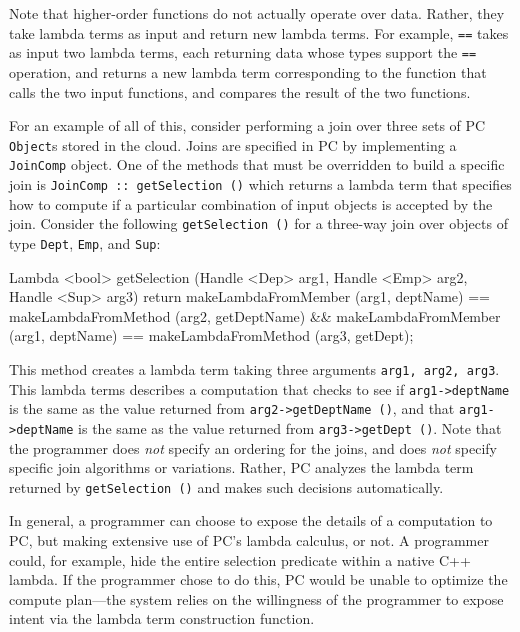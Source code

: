 \noindent Note that higher-order functions do
not actually operate over data.  Rather, they
take lambda terms as input and return new lambda terms.  For example, \texttt{==} takes as input two lambda terms, each returning data whose types
support the \texttt{==} operation, and returns
a new lambda term corresponding to the function that calls the two input functions, and compares the result of the two functions.

For an example of all of this, consider performing a join over three sets of PC \texttt{Object}s stored in the cloud.  
Joins are specified in PC 
by implementing a \texttt{JoinComp} object. One of the methods that must be overridden to build a specific join is \texttt{JoinComp :: getSelection ()}
which returns a lambda term
that specifies how to compute if a particular combination of input objects is accepted by the join.  Consider the following
\texttt{getSelection ()} for a three-way join over objects of type \texttt{Dept}, \texttt{Emp}, and \texttt{Sup}:

\begin{codesmall} 
Lambda <bool> getSelection (Handle <Dep> arg1, Handle <Emp> arg2, Handle <Sup> arg3) {
	return makeLambdaFromMember (arg1, deptName) == 
	       makeLambdaFromMethod (arg2, getDeptName) &&
	       makeLambdaFromMember (arg1, deptName) == 
               makeLambdaFromMethod (arg3, getDept);
}
\end{codesmall}

\noindent
This method creates a lambda term taking three arguments \texttt{arg1, arg2, arg3}.  This lambda terms describes a computation that
checks to see if \texttt{arg1->deptName} is the same as the value returned from \texttt{arg2->getDeptName ()}, and
that \texttt{arg1->deptName} is the same as the value returned from \texttt{arg3}\-\texttt{->getDept ()}. 
Note that the programmer does \emph{not} specify an ordering for the joins, and does \emph{not} specify specific join algorithms or variations.  Rather, PC
analyzes the lambda term returned by \texttt{getSelection ()} and makes such decisions automatically.

In general, a programmer can choose to expose the details of a computation to PC, but making extensive use of PC's lambda
calculus, or not.  A programmer could, for example, hide the entire selection predicate within a native C++ lambda.
If the programmer chose to do this, PC would be unable to optimize the compute plan---the system relies on the willingness of the 
programmer to expose intent via the lambda term construction function.

